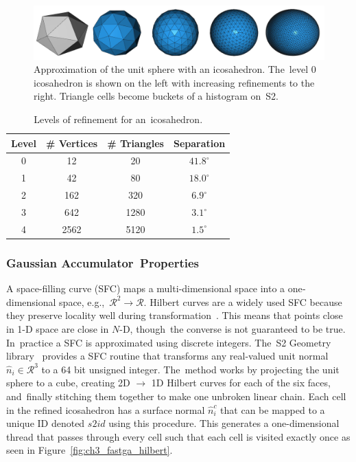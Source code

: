 \begin{figure}[H]
    \centering
    \includegraphics[width=.60\linewidth]{chapter_3_polylidar3d/imgs/fastga_ico_refinement_v2.png}
    \caption[Approximation of the unit sphere with an icosahedron]{Approximation of the unit sphere with an icosahedron. The~level 0 icosahedron is shown on the  left with increasing refinements to the right.  Triangle cells become buckets of a histogram on~S2. }
    \label{fig:ch3_fastga_refinement}
\end{figure}
\unskip

\begin{table}[H]
\centering
\caption{Levels of refinement for an~icosahedron.}\label{table:ch3_fastga_refinement}
\begin{tabular}{@{}cccc@{}}
\toprule
\textbf{Level} & \textbf{\# Vertices} & \textbf{\# Triangles }& \textbf{Separation} \\ \midrule
0     & 12          & 20           & $41.8^{\circ}$          \\
1     & 42          & 80           & $18.0^{\circ}$            \\
2     & 162         & 320          & $6.9^{\circ}$              \\
3     & 642         & 1280         & $3.1^{\circ}$              \\
4     & 2562        & 5120         & $1.5^{\circ}$              \\ \bottomrule
\end{tabular}
\end{table}
\unskip



\subsubsection{Gaussian Accumulator~Properties}\label{sec:ch3_methods_fastga_ga}

A space-filling curve (SFC) maps a multi‐dimensional space into a one‐dimensional space, e.g.,~$\mathcal{R}^2 \rightarrow \mathcal{R}$.  Hilbert curves are a widely used SFC because they preserve locality well during transformation~\cite{mokbel_space-filling_2008}. This means that points close in 1-D space are close in $N$-D, though~the converse is not guaranteed to be true. In~practice a SFC is approximated using discrete integers. The~S2 Geometry library~\cite{google_s2_2020} provides a SFC routine that transforms any real-valued unit normal $\hat{n}_i \in \mathcal{R}^3$ to a 64 bit unsigned integer. The~method works by projecting the unit sphere to a cube, creating 2D $\rightarrow$ 1D Hilbert curves for each of the six faces, and~finally stitching them together to make one unbroken linear chain.  Each cell in the refined icosahedron has a surface normal $\hat{n}^{c}_{i}$ that can be mapped to a unique ID denoted $s2id$ using this procedure. This generates a one-dimensional thread that passes through every cell such that each cell is visited exactly once as seen in Figure~\ref{fig:ch3_fastga_hilbert}.

